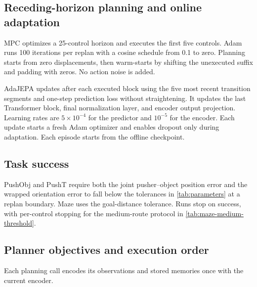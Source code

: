 \subsection{Receding-horizon planning and online adaptation}
MPC optimizes a 25-control horizon and executes the first five controls. Adam runs 100 iterations per replan with a cosine schedule from 0.1 to zero. Planning starts from zero displacements, then warm-starts by shifting the unexecuted suffix and padding with zeros. No action noise is added.

AdaJEPA updates after each executed block using the five most recent transition segments and one-step prediction loss without straightening. It updates the last Transformer block, final normalization layer, and encoder output projection. Learning rates are $5\times10^{-4}$ for the predictor and $10^{-5}$ for the encoder. Each update starts a fresh Adam optimizer and enables dropout only during adaptation. Each episode starts from the offline checkpoint.

\subsection{Task success}
PushObj and PushT require both the joint pusher--object position error and the wrapped orientation error to fall below the tolerances in \cref{tab:parameters} at a replan boundary. Maze uses the goal-distance tolerance. Runs stop on success, with per-control stopping for the medium-route protocol in \cref{tab:maze-medium-threshold}.

\subsection{Planner objectives and execution order}
\label{sec:parameters}
Each planning call encodes its observations and stored memories once with the current encoder.

